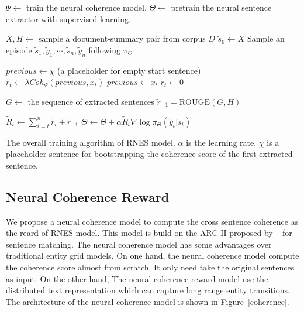 \documentclass[letterpaper]{article} %
\begin{document}
	\begin{algorithm}[t]
		\small
		\begin{algorithmic}[1]
			\State $\Psi \leftarrow$ train the neural coherence model.
			\State $\Theta \leftarrow$ pretrain the neural sentence extractor with supervised learning.

			\Loop
			
			\State $X, H \leftarrow$ sample a document-summary pair from corpus $D$
			\State $\tilde{s}_0 \leftarrow X$
			\State Sample an episode $\tilde{s}_1, \tilde{y}_1, \cdots, \tilde{s}_n, \tilde{y}_n$ following $\pi_{\Theta}$
			
			\State $previous \leftarrow \chi$ (a placeholder for empty start sentence)
				\State $\tilde{r}_t \leftarrow \lambda Coh_{\Psi}(previous, x_t)$
				\State $previous \leftarrow x_t$
			\Else
				\State $\tilde{r}_t \leftarrow 0 $
			\EndIf
			\EndFor
			
			
			\State $G \leftarrow$ the sequence of extracted sentences
			\State $\tilde{r}_{-1} = \text{ROUGE}(G, H)$
			
			\State $\tilde{R}_t \leftarrow \sum_{i=t}^{n} \tilde{r}_i + \tilde{r}_{-1}$
			\State $\Theta \leftarrow \Theta + \alpha \tilde{R}_t \nabla \log \pi_{\Theta}(\tilde{y}_t|\tilde{s}_t)$
			\EndFor
			
			\EndLoop
			
		\end{algorithmic}
		\caption{The overall training algorithm of RNES model. $\alpha$ is the learning rate, $\chi$ is a placeholder sentence for bootstrapping the coherence score of the first extracted sentence.}
		\label{algo_rnes}
	\end{algorithm}
	\vspace{-4pt}

	\label{RL}
	\subsection{Neural Coherence Reward}
	\label{ncr}
	We propose a neural coherence model to compute the cross sentence coherence as the reard of RNES model. This model is build on the ARC-II proposed by ~\cite{NIPS2014_hu} for sentence matching. The neural coherence model has some advantages over traditional entity grid models. On one hand, the neural coherence model compute the coherence score almost from scratch. It only need take the original sentences as input. On the other hand,  The neural coherence reward model use the distributed text representation which can capture long range entity transitions. The architecture of the neural coherence model is shown in Figure~\ref{coherence}. 
\end{document}
